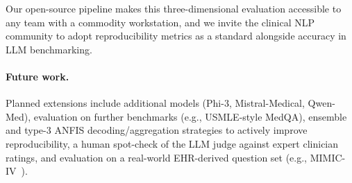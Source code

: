 \documentclass[11pt]{article}
\begin{document}
Our open-source pipeline makes this three-dimensional evaluation
accessible to any team with a commodity workstation, and we invite
the clinical NLP community to adopt reproducibility metrics as a
standard alongside accuracy in LLM benchmarking.

\paragraph{Future work.}
Planned extensions include additional models (Phi-3, Mistral-Medical,
Qwen-Med), evaluation on further benchmarks (e.g., USMLE-style MedQA),
ensemble and type-3 ANFIS decoding/aggregation strategies to actively
improve reproducibility, a human spot-check of the LLM judge against
expert clinician ratings, and evaluation on a real-world EHR-derived
question set (e.g., MIMIC-IV~\cite{johnson2023mimic}).
\end{document}
